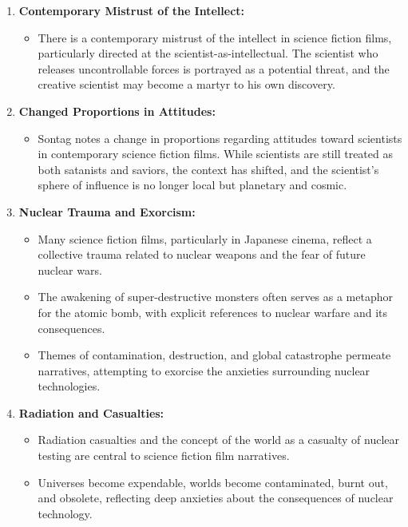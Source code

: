 \documentclass[11pt,fleqn]{book} %
\begin{document}
\begin{enumerate}[label=\arabic*.]
    \item \textbf{Contemporary Mistrust of the Intellect:}
    \begin{itemize}
        \item There is a contemporary mistrust of the intellect in science fiction films, particularly directed at the scientist-as-intellectual. The scientist who releases uncontrollable forces is portrayed as a potential threat, and the creative scientist may become a martyr to his own discovery.
    \end{itemize}

    \item \textbf{Changed Proportions in Attitudes:}
    \begin{itemize}
        \item Sontag notes a change in proportions regarding attitudes toward scientists in contemporary science fiction films. While scientists are still treated as both satanists and saviors, the context has shifted, and the scientist's sphere of influence is no longer local but planetary and cosmic.
    \end{itemize}
    
    \item \textbf{Nuclear Trauma and Exorcism:}
    \begin{itemize}
    \item Many science fiction films, particularly in Japanese cinema, reflect a collective trauma related to nuclear weapons and the fear of future nuclear wars.
    \item The awakening of super-destructive monsters often serves as a metaphor for the atomic bomb, with explicit references to nuclear warfare and its consequences.
    \item Themes of contamination, destruction, and global catastrophe permeate narratives, attempting to exorcise the anxieties surrounding nuclear technologies.
    \end{itemize}
\item \textbf{Radiation and Casualties:}
\begin{itemize}
    \item Radiation casualties and the concept of the world as a casualty of nuclear testing are central to science fiction film narratives.
    \item Universes become expendable, worlds become contaminated, burnt out, and obsolete, reflecting deep anxieties about the consequences of nuclear technology.
\end{itemize}


\end{enumerate}
\end{document}
